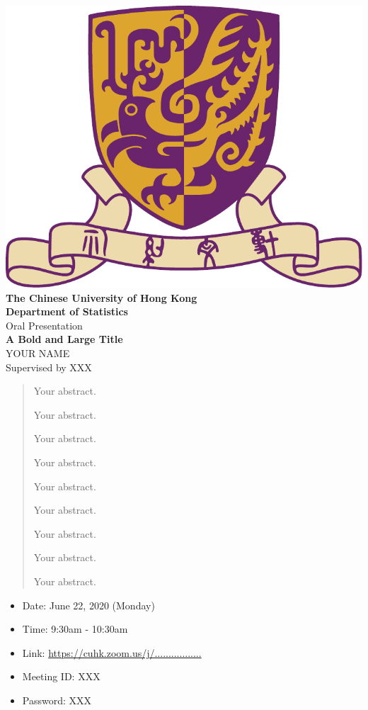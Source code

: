 \documentclass[11pt]{article}
\newcommand*{\mytitle}
{
  \begingroup
  \begin{center}
    \includegraphics[width=0.25\linewidth]{CUHK.pdf}\\[4ex]
    {\LARGE \bfseries {The Chinese University of Hong Kong}}\\[2ex]
    {\LARGE \bfseries {Department of Statistics}}\\[4ex]
    {\LARGE {Oral Presentation}}\\[5ex]
    {\large \bfseries{A Bold and Large Title}}\\[2ex]
    {YOUR NAME}\\[2ex]
    {Supervised by XXX}\\[10ex]
  \end{center}
  \endgroup
}
\begin{document}
\thispagestyle{empty}
\mytitle
  \begin{abstract}
	  Your abstract.
	  
	  Your abstract.
	  
	  Your abstract.
	  
	  Your abstract.
	  
	  Your abstract.
	  
	  Your abstract.
	  
	  Your abstract.
	   
	  Your abstract.
	  
	  Your abstract.
  \end{abstract}
  \vskip 0.3in
  \begin{itemize}[label=]
    \item Date: June 22, 2020 (Monday)
    \item Time: 9:30am - 10:30am
    \item Link: \url{https://cuhk.zoom.us/j/.................}
    \item Meeting ID: XXX
    \item Password: XXX
  \end{itemize}
\end{document}
